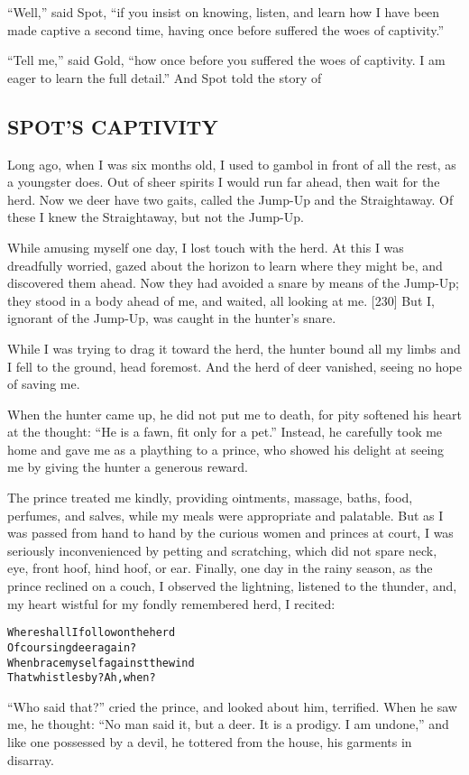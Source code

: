 \documentclass{article}
\renewenvironment{verbatim}{\begin{alltt}\normalfont\begin{centering}}{\end{centering}\end{alltt}}
\begin{document}
``Well,'' said Spot,
``if you insist on knowing, listen, and learn how I have been made captive a second time, having once before suffered the woes of captivity.''

``Tell me,'' said Gold,
``how once before you suffered the woes of captivity. I am eager to learn the full detail.''
And Spot told the story of

\subsection{SPOT'S CAPTIVITY}

Long ago, when I was six months old, I used to gambol in front of
all the rest, as a youngster does. Out of sheer spirits I would run
far ahead, then wait for the herd. Now we deer have two gaits,
called the Jump-Up and the Straightaway. Of these I knew the
Straightaway, but not the Jump-Up.

While amusing myself one day, I lost touch with the herd. At this I
was dreadfully worried, gazed about the horizon to learn where they
might be, and discovered them ahead. Now they had avoided a snare
by means of the Jump-Up; they stood in a body ahead of me, and
waited, all looking at me. [230] But I, ignorant of the Jump-Up,
was caught in the hunter's snare.

While I was trying to drag it toward the herd, the hunter bound all
my limbs and I fell to the ground, head foremost. And the herd of
deer vanished, seeing no hope of saving me.

When the hunter came up, he did not put me to death, for pity
softened his heart at the thought:
``He is a fawn, fit only for a pet.'' Instead, he carefully took me
home and gave me as a plaything to a prince, who showed his delight
at seeing me by giving the hunter a generous reward.

The prince treated me kindly, providing ointments, massage, baths,
food, perfumes, and salves, while my meals were appropriate and
palatable. But as I was passed from hand to hand by the curious
women and princes at court, I was seriously inconvenienced by
petting and scratching, which did not spare neck, eye, front hoof,
hind hoof, or ear. Finally, one day in the rainy season, as the
prince reclined on a couch, I observed the lightning, listened to
the thunder, and, my heart wistful for my fondly remembered herd, I
recited:

\begin{verbatim}
Where shall I follow on the herd
    Of coursing deer again?
When brace myself against the wind
    That whistles by? Ah, when?
\end{verbatim}
``Who said that?'' cried the prince, and looked about him,
terrified. When he saw me, he thought:
``No man said it, but a deer. It is a prodigy. I am undone,'' and
like one possessed by a devil, he tottered from the house, his
garments in disarray.
\end{document}
